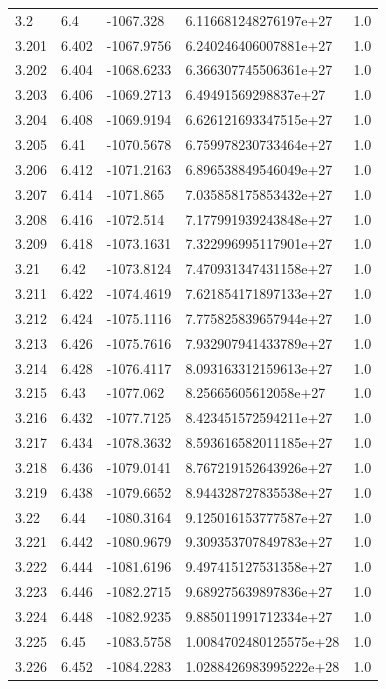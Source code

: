 \begin{tabular}{lllll}
3.2 & 6.4 & -1067.328 & 6.116681248276197e+27 & 1.0 \\
3.201 & 6.402 & -1067.9756 & 6.240246406007881e+27 & 1.0 \\
3.202 & 6.404 & -1068.6233 & 6.366307745506361e+27 & 1.0 \\
3.203 & 6.406 & -1069.2713 & 6.49491569298837e+27 & 1.0 \\
3.204 & 6.408 & -1069.9194 & 6.626121693347515e+27 & 1.0 \\
3.205 & 6.41 & -1070.5678 & 6.759978230733464e+27 & 1.0 \\
3.206 & 6.412 & -1071.2163 & 6.896538849546049e+27 & 1.0 \\
3.207 & 6.414 & -1071.865 & 7.035858175853432e+27 & 1.0 \\
3.208 & 6.416 & -1072.514 & 7.177991939243848e+27 & 1.0 \\
3.209 & 6.418 & -1073.1631 & 7.322996995117901e+27 & 1.0 \\
3.21 & 6.42 & -1073.8124 & 7.470931347431158e+27 & 1.0 \\
3.211 & 6.422 & -1074.4619 & 7.621854171897133e+27 & 1.0 \\
3.212 & 6.424 & -1075.1116 & 7.775825839657944e+27 & 1.0 \\
3.213 & 6.426 & -1075.7616 & 7.932907941433789e+27 & 1.0 \\
3.214 & 6.428 & -1076.4117 & 8.093163312159613e+27 & 1.0 \\
3.215 & 6.43 & -1077.062 & 8.25665605612058e+27 & 1.0 \\
3.216 & 6.432 & -1077.7125 & 8.423451572594211e+27 & 1.0 \\
3.217 & 6.434 & -1078.3632 & 8.593616582011185e+27 & 1.0 \\
3.218 & 6.436 & -1079.0141 & 8.767219152643926e+27 & 1.0 \\
3.219 & 6.438 & -1079.6652 & 8.944328727835538e+27 & 1.0 \\
3.22 & 6.44 & -1080.3164 & 9.125016153777587e+27 & 1.0 \\
3.221 & 6.442 & -1080.9679 & 9.309353707849783e+27 & 1.0 \\
3.222 & 6.444 & -1081.6196 & 9.497415127531358e+27 & 1.0 \\
3.223 & 6.446 & -1082.2715 & 9.689275639897836e+27 & 1.0 \\
3.224 & 6.448 & -1082.9235 & 9.885011991712334e+27 & 1.0 \\
3.225 & 6.45 & -1083.5758 & 1.0084702480125575e+28 & 1.0 \\
3.226 & 6.452 & -1084.2283 & 1.0288426983995222e+28 & 1.0 \\

\end{tabular}
